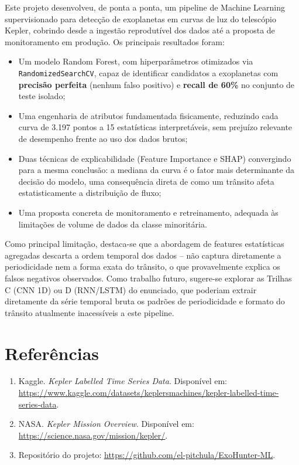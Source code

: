 \documentclass[12pt,a4paper]{article}
\begin{document}
Este projeto desenvolveu, de ponta a ponta, um pipeline de Machine Learning supervisionado para detecção de exoplanetas em curvas de luz do telescópio Kepler, cobrindo desde a ingestão reprodutível dos dados até a proposta de monitoramento em produção. Os principais resultados foram:

\begin{itemize}[leftmargin=1.5cm]
    \item Um modelo Random Forest, com hiperparâmetros otimizados via \texttt{RandomizedSearchCV}, capaz de identificar candidatos a exoplanetas com \textbf{precisão perfeita} (nenhum falso positivo) e \textbf{recall de 60\%} no conjunto de teste isolado;
    \item Uma engenharia de atributos fundamentada fisicamente, reduzindo cada curva de 3.197 pontos a 15 estatísticas interpretáveis, sem prejuízo relevante de desempenho frente ao uso dos dados brutos;
    \item Duas técnicas de explicabilidade (Feature Importance e SHAP) convergindo para a mesma conclusão: a mediana da curva é o fator mais determinante da decisão do modelo, uma consequência direta de como um trânsito afeta estatisticamente a distribuição de fluxo;
    \item Uma proposta concreta de monitoramento e retreinamento, adequada às limitações de volume de dados da classe minoritária.
\end{itemize}

Como principal limitação, destaca-se que a abordagem de features estatísticas agregadas descarta a ordem temporal dos dados -- não captura diretamente a periodicidade nem a forma exata do trânsito, o que provavelmente explica os falsos negativos observados. Como trabalho futuro, sugere-se explorar as Trilhas C (CNN 1D) ou D (RNN/LSTM) do enunciado, que poderiam extrair diretamente da série temporal bruta os padrões de periodicidade e formato do trânsito atualmente inacessíveis a este pipeline.

\newpage
\section*{Referências}

\begin{enumerate}[leftmargin=1.5cm]
    \item Kaggle. \textit{Kepler Labelled Time Series Data}. Disponível em: \url{https://www.kaggle.com/datasets/keplersmachines/kepler-labelled-time-series-data}.
    \item NASA. \textit{Kepler Mission Overview}. Disponível em: \url{https://science.nasa.gov/mission/kepler/}.
    \item Repositório do projeto: \url{https://github.com/el-pitchula/ExoHunter-ML}.
\end{enumerate}
\end{document}
